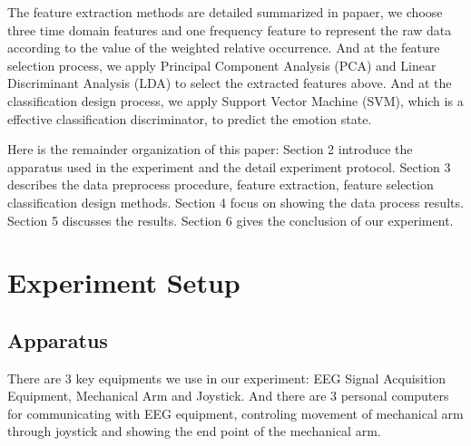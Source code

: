 \documentclass[runningheads,a4paper]{llncs}
\begin{document}
The feature extraction methods are detailed summarized in papaer\cite{Feature}, we choose
three time domain features and one frequency feature to represent the raw data according
to the value of the weighted relative occurrence. And at the feature selection process,
we apply Principal Component Analysis (PCA) and Linear Discriminant Analysis (LDA) to
select the extracted features above. And at the classification design process, we apply
Support Vector Machine (SVM), which is a effective classification discriminator,
to predict the emotion state.

Here is the remainder organization of this paper: Section 2 introduce the
apparatus used in the experiment and the detail experiment protocol. Section 3
describes the data preprocess procedure, feature extraction, feature selection
classification design methods. Section 4 focus on showing the data process
results. Section 5 discusses the results. Section 6 gives the conclusion of
our experiment.

\section{Experiment Setup}
\subsection{Apparatus}
There are 3 key equipments we use in our experiment: EEG Signal Acquisition Equipment,
Mechanical Arm and Joystick. And there are 3 personal computers for communicating
with EEG equipment, controling movement of mechanical arm through joystick and
showing the end point of the mechanical arm.
\end{document}
